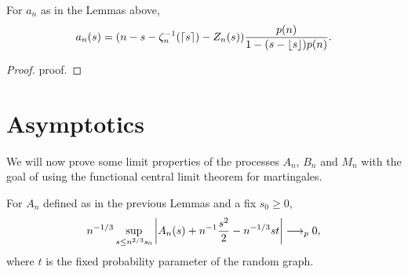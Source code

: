 \begin{lemma} \label{L: formula an}
	For $a_n$ as in the Lemmas above,
	\begin{equation}
		a_n(s) = (n - s - \zeta^{-1}_n(\lceil s\rceil) - Z_n(s)) \frac{p(n)}{1-(s-\lfloor s\rfloor)p(n)} .
	\end{equation}
\end{lemma}


\begin{proof} \label{P: formula an}
	proof.
\end{proof}


\section{Asymptotics}

We will now prove some limit properties of the processes $A_n$, $B_n$ and $M_n$ with the goal of using the functional central limit theorem for martingales.


\begin{lemma} \label{L: limit An}
	For $A_n$ defined as in the previous Lemmas and a fix $s_0 \geq 0$,
	\begin{equation} \label{E: limit An}
	n^{-1 / 3} \sup_{s \leq n^{2 / 3} s_0 } \left| A_n(s) + n^{-1}\frac{s^2}{2} - n^{-1 / 3}st \right| \longrightarrow_p 0,
	\end{equation}
	where $t$ is the fixed probability parameter of the random graph.
\end{lemma}


